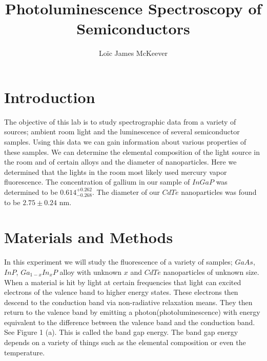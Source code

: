 \documentclass{article}
\begin{document}
\title{Photoluminescence Spectroscopy of Semiconductors}
\author{Loïc James McKeever}

\maketitle

\section{Introduction}

The objective of this lab is to study spectrographic data from a variety of sources; ambient room light and the luminescence of several semiconductor samples.  Using this data we can gain information about various properties of these samples.  We can determine the elemental composition of the light source in the room and of certain alloys and the diameter of nanoparticles.  Here we determined that the lights in the room most likely used mercury vapor fluorescence.  The concentration of gallium in our sample of $InGaP$ was determined to be $0.614_{-0.268}^{+0.262}$.  The diameter of our $CdTe$ nanoparticles was found to be $2.75 \pm 0.24$ nm.

\section{Materials and Methods}

In this experiment we will study the fluorescence of a variety of samples; $GaAs$, $InP$, $Ga_{1-x}In_{x}P$ alloy with unknown $x$ and $CdTe$ nanoparticles of unknown size. When a material is hit by light at certain frequencies that light can excited electrons of the valence band to higher energy states.  These electrons then descend to the conduction band via non-radiative relaxation means.  They then return to the valence band by emitting a photon(photoluminescence) with energy equivalent to the difference between the valence band and the conduction band.  See Figure 1 (a).  This is called the band gap energy.  The band gap energy depends on a variety of things such as the elemental composition or even the temperature. 
\end{document}
